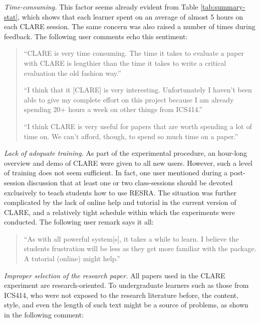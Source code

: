 \begin{itemizenoindent}
\item {\it Time-consuming.\/} This factor seems already evident from
  Table \ref{tab:summary-stat}, which shows that each learner spent on an
  average of almost 5 hours on each CLARE session. The same concern was
  also raised a number of times during feedback. The following user
  comments echo this sentiment:

  \small
  \begin{quote}
     ``CLARE is very time consuming. The time it takes to evaluate a
     paper with CLARE is lengthier than the time it takes to write a
     critical evaluation the old fashion way.'' \\ \par

    ``I think that it [CLARE] is very interesting. Unfortunately I
    haven't been able to give my complete effort on this project
    because I am already spending 20+ hours a week on other things from
    ICS414.'' \\ \par
    
    ``I think CLARE is very useful for papers that are worth spending a
    lot of time on. We can't afford, though, to spend so much time on a
    paper.''
  \end{quote}
\normalsize
{}

\item {\it Lack of adequate training.\/} As part of the experimental
  procedure, an hour-long overview and demo of CLARE were given to all new
  users. However, such a level of training does not seem sufficient.  In
  fact, one user mentioned during a post-session discussion that at least
  one or two class-sessions should be devoted exclusively to teach students
  how to use RESRA. The situation was further complicated by the lack of
  online help and tutorial in the current version of CLARE, and a relatively
  tight schedule within which the experiments were conducted. The following
  user remark says it all:

  \small
  \begin{quote}
    ``As with all powerful system[s], it takes a while to learn. I believe
    the students frustration will be less as they get more familiar
    with the package. A tutorial (online) might help.''
  \end{quote}
    \normalsize
    
  \item {\it Improper selection of the research paper.\/} All papers
    used in the CLARE experiment are research-oriented. To undergraduate
    learners such as those from ICS414, who were not exposed to the
    research literature before, the content, style, and even the length
    of such text might be a source of problems, as shown in the following
    comment:


\end{itemizenoindent}
